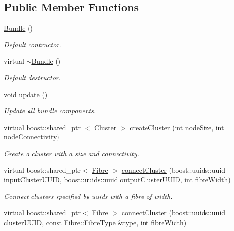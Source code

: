 \subsection*{\-Public \-Member \-Functions}
\begin{DoxyCompactItemize}
\item 
\hyperlink{classcryomesh_1_1structures_1_1Bundle_a8d6b95207324291f919f1835b81b1640}{\-Bundle} ()
\begin{DoxyCompactList}\small\item\em \-Default contructor. \end{DoxyCompactList}\item 
virtual \hyperlink{classcryomesh_1_1structures_1_1Bundle_ab2ec2696336dddbae17166c056c2f038}{$\sim$\-Bundle} ()
\begin{DoxyCompactList}\small\item\em \-Default destructor. \end{DoxyCompactList}\item 
void \hyperlink{classcryomesh_1_1structures_1_1Bundle_add5af28ceb5c7722d267ba32810c5df7}{update} ()
\begin{DoxyCompactList}\small\item\em \-Update all bundle components. \end{DoxyCompactList}\item 
virtual boost\-::shared\-\_\-ptr\*
$<$ \hyperlink{classcryomesh_1_1structures_1_1Cluster}{\-Cluster} $>$ \hyperlink{classcryomesh_1_1structures_1_1Bundle_a6228d35bd96caa191bd89096dd260ee2}{create\-Cluster} (int node\-Size, int node\-Connectivity)
\begin{DoxyCompactList}\small\item\em \-Create a cluster with a size and connectivity. \end{DoxyCompactList}\item 
virtual boost\-::shared\-\_\-ptr$<$ \hyperlink{classcryomesh_1_1structures_1_1Fibre}{\-Fibre} $>$ \hyperlink{classcryomesh_1_1structures_1_1Bundle_af1884f99e746cdfa549b63f1589b5dac}{connect\-Cluster} (boost\-::uuids\-::uuid input\-Cluster\-U\-U\-I\-D, boost\-::uuids\-::uuid output\-Cluster\-U\-U\-I\-D, int fibre\-Width)
\begin{DoxyCompactList}\small\item\em \-Connect clusters specified by uuids with a fibre of width. \end{DoxyCompactList}\item 
virtual boost\-::shared\-\_\-ptr$<$ \hyperlink{classcryomesh_1_1structures_1_1Fibre}{\-Fibre} $>$ \hyperlink{classcryomesh_1_1structures_1_1Bundle_adc784bc4a171eb28b5a7d038fe73f2de}{connect\-Cluster} (boost\-::uuids\-::uuid cluster\-U\-U\-I\-D, const \hyperlink{classcryomesh_1_1structures_1_1Fibre_aecbba6d46a76f888b3722491b674f5e4}{\-Fibre\-::\-Fibre\-Type} \&type, int fibre\-Width)

\end{DoxyCompactItemize}
